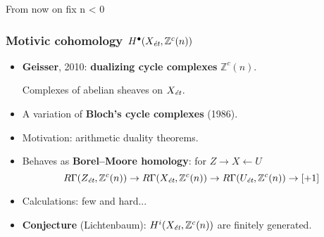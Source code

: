 \documentclass[handout]{beamer}
\newcommand{\ZZ}{\mathbb{Z}}
\begin{document}

\begin{frame}[plain]
  \headingfont

  \begin{center}
    {\huge From now on fix n < 0}
  \end{center}
\end{frame}


\begin{frame}
  \frametitle{Motivic cohomology $H^\bullet (X_\text{\it ét}, \ZZ^c (n))$}

  \begin{itemize}
  \item<2-> \textbf{Geisser}, 2010: \textbf{dualizing cycle complexes}
    $\ZZ^c (n)$.

    Complexes of abelian sheaves on $X_\text{\it ét}$.

  \item<3-> A variation of \textbf{Bloch's cycle complexes} (1986).

  \item<4-> Motivation: arithmetic duality theorems.

  \item<5-> Behaves as \textbf{Borel--Moore homology}: for
    $Z \to X \leftarrow U$
    $$R\Gamma (Z_\text{\it ét}, \ZZ^c (n)) \to R\Gamma (X_\text{\it ét}, \ZZ^c (n)) \to R\Gamma (U_\text{\it ét}, \ZZ^c (n)) \to [+1]$$

  \item<6-> Calculations: few and hard...

  \item<7-> \textbf{Conjecture} (Lichtenbaum):
    $H^i (X_\text{\it ét}, \ZZ^c (n))$ are finitely generated.
  \end{itemize}
\end{frame}

\end{document}
